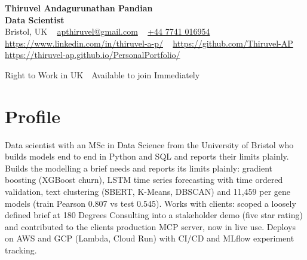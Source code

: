\documentclass[a4paper,11pt]{article}
\begin{document}
\begin{center}
  {\LARGE\bfseries Thiruvel Andagurunathan Pandian} \\[3pt]
  {\color{headernavy}\small\textbf{Data Scientist}} \\[3pt]
  {\small
  Bristol, UK\nobreak\ \,\textbar\, \href{mailto:apthiruvel@gmail.com}{apthiruvel@gmail.com}\nobreak\ \,\textbar\, \href{tel:+447741016954}{+44 7741 016954}\nobreak\ \,\textbar\, \href{https://www.linkedin.com/in/thiruvel-a-p/}{https://www.linkedin.com/in/thiruvel-a-p/}\nobreak\ \,\textbar\, \href{https://github.com/Thiruvel-AP}{https://github.com/Thiruvel-AP}\nobreak\ \,\textbar\, \href{https://thiruvel-ap.github.io/PersonalPortfolio/}{https://thiruvel-ap.github.io/PersonalPortfolio/}}\par\vspace{4pt}
  \noindent{} Right to Work in UK \,\textbar\, Available to join Immediately
\end{center}

\section{Profile}
Data scientist with an MSc in Data Science from the University of Bristol who builds models end to end in Python and SQL and reports their limits plainly. Builds the modelling a brief needs and reports its limits plainly: gradient boosting (XGBoost churn), LSTM time series forecasting with time ordered validation, text clustering (SBERT, K-Means, DBSCAN) and 11,459 per gene models (train Pearson 0.807 vs test 0.545). Works with clients: scoped a loosely defined brief at 180 Degrees Consulting into a stakeholder demo (five star rating) and contributed to the client\textquotesingle{}s production MCP server, now in live use. Deploys on AWS and GCP (Lambda, Cloud Run) with CI/CD and MLflow experiment tracking.
\end{document}

